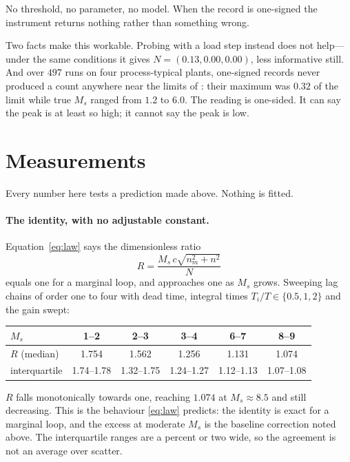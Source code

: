 \documentclass[final,3p,times,twocolumn]{elsarticle}
\begin{document}
No threshold, no parameter, no model. When the record is one-signed the
instrument returns nothing rather than something wrong.

Two facts make this workable. Probing with a load step instead does not
help---under the same conditions it gives $N=(0.13,0.00,0.00)$, less
informative still. And over $497$ runs on four process-typical plants,
one-signed records never produced a count anywhere near the limits of
\cite{SPIN}: their maximum was $0.32$ of the limit while true $M_s$
ranged from $1.2$ to $6.0$. The reading is one-sided. It can say the
peak is at least so high; it cannot say the peak is low.

\section{Measurements}
\label{sec:measure}

Every number here tests a prediction made above. Nothing is fitted.

\paragraph{The identity, with no adjustable constant.}
Equation~\eqref{eq:law} says the dimensionless ratio
\begin{equation}
R=\frac{M_s\,c\sqrt{n_m^2+n^2}}{N}
\label{eq:ratio}
\end{equation}
equals one for a marginal loop, and approaches one as $M_s$ grows.
Sweeping lag chains of order one to four with dead time, integral times
$T_i/T\in\{0.5,1,2\}$ and the gain swept:

\begin{center}
\begin{tabular}{lccccc}
\toprule
$M_s$ & 1--2 & 2--3 & 3--4 & 6--7 & 8--9 \\
\midrule
$R$ (median) & 1.754 & 1.562 & 1.256 & 1.131 & 1.074 \\
interquartile & 1.74--1.78 & 1.32--1.75 & 1.24--1.27 & 1.12--1.13 & 1.07--1.08 \\
\bottomrule
\end{tabular}
\end{center}

\noindent
$R$ falls monotonically towards one, reaching $1.074$ at $M_s\approx8.5$
and still decreasing. This is the behaviour \eqref{eq:law} predicts: the
identity is exact for a marginal loop, and the excess at moderate $M_s$
is the baseline correction noted above. The interquartile ranges are a
percent or two wide, so the agreement is not an average over scatter.
\end{document}
